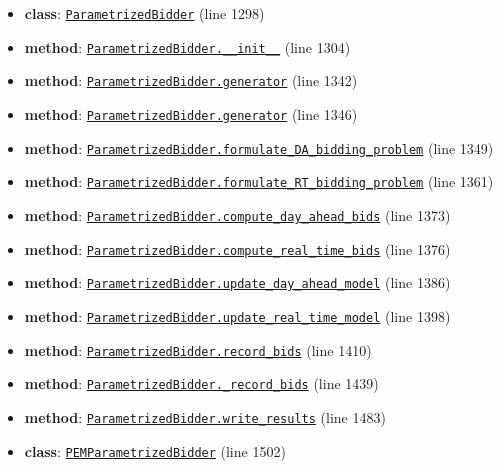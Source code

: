 \documentclass[11pt]{report}
\begin{document}
\begin{itemize}[leftmargin=*]
  \item \textbf{class}: \hyperref[def:bidder.py:ParametrizedBidder:L1298]{\texttt{ParametrizedBidder}} (line 1298)
  \item \textbf{method}: \hyperref[def:bidder.py:ParametrizedBidder.__init__:L1304]{\texttt{ParametrizedBidder.\_\_init\_\_}} (line 1304)
  \item \textbf{method}: \hyperref[def:bidder.py:ParametrizedBidder.generator:L1342]{\texttt{ParametrizedBidder.generator}} (line 1342)
  \item \textbf{method}: \hyperref[def:bidder.py:ParametrizedBidder.generator:L1346]{\texttt{ParametrizedBidder.generator}} (line 1346)
  \item \textbf{method}: \hyperref[def:bidder.py:ParametrizedBidder.formulate_DA_bidding_problem:L1349]{\texttt{ParametrizedBidder.formulate\_DA\_bidding\_problem}} (line 1349)
  \item \textbf{method}: \hyperref[def:bidder.py:ParametrizedBidder.formulate_RT_bidding_problem:L1361]{\texttt{ParametrizedBidder.formulate\_RT\_bidding\_problem}} (line 1361)
  \item \textbf{method}: \hyperref[def:bidder.py:ParametrizedBidder.compute_day_ahead_bids:L1373]{\texttt{ParametrizedBidder.compute\_day\_ahead\_bids}} (line 1373)
  \item \textbf{method}: \hyperref[def:bidder.py:ParametrizedBidder.compute_real_time_bids:L1376]{\texttt{ParametrizedBidder.compute\_real\_time\_bids}} (line 1376)
  \item \textbf{method}: \hyperref[def:bidder.py:ParametrizedBidder.update_day_ahead_model:L1386]{\texttt{ParametrizedBidder.update\_day\_ahead\_model}} (line 1386)
  \item \textbf{method}: \hyperref[def:bidder.py:ParametrizedBidder.update_real_time_model:L1398]{\texttt{ParametrizedBidder.update\_real\_time\_model}} (line 1398)
  \item \textbf{method}: \hyperref[def:bidder.py:ParametrizedBidder.record_bids:L1410]{\texttt{ParametrizedBidder.record\_bids}} (line 1410)
  \item \textbf{method}: \hyperref[def:bidder.py:ParametrizedBidder._record_bids:L1439]{\texttt{ParametrizedBidder.\_record\_bids}} (line 1439)
  \item \textbf{method}: \hyperref[def:bidder.py:ParametrizedBidder.write_results:L1483]{\texttt{ParametrizedBidder.write\_results}} (line 1483)
  \item \textbf{class}: \hyperref[def:bidder.py:PEMParametrizedBidder:L1502]{\texttt{PEMParametrizedBidder}} (line 1502)

\end{itemize}
\end{document}
